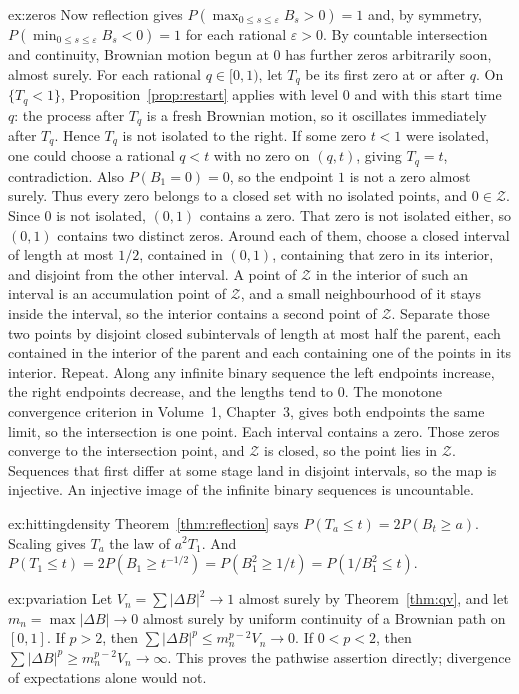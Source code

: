 \begin{solution}{ex:zeros}
Now reflection gives $P(\max_{0\le s\le\varepsilon}B_s>0)=1$ and, by symmetry, $P(\min_{0\le s\le\varepsilon}B_s<0)=1$ for each rational $\varepsilon>0$. By countable intersection and continuity, Brownian motion begun at $0$ has further zeros arbitrarily soon, almost surely. For each rational $q\in[0,1)$, let $T_q$ be its first zero at or after $q$. On $\{T_q<1\}$, Proposition~\ref{prop:restart} applies with level $0$ and with this start time $q$: the process after $T_q$ is a fresh Brownian motion, so it oscillates immediately after $T_q$. Hence $T_q$ is not isolated to the right. If some zero $t<1$ were isolated, one could choose a rational $q<t$ with no zero on $(q,t)$, giving $T_q=t$, contradiction. Also $P(B_1=0)=0$, so the endpoint $1$ is not a zero almost surely. Thus every zero belongs to a closed set with no isolated points, and $0\in\mathcal Z$. Since $0$ is not isolated, $(0,1)$ contains a zero. That zero is not isolated either, so $(0,1)$ contains two distinct zeros. Around each of them, choose a closed interval of length at most $1/2$, contained in $(0,1)$, containing that zero in its interior, and disjoint from the other interval. A point of $\mathcal Z$ in the interior of such an interval is an accumulation point of $\mathcal Z$, and a small neighbourhood of it stays inside the interval, so the interior contains a second point of $\mathcal Z$. Separate those two points by disjoint closed subintervals of length at most half the parent, each contained in the interior of the parent and each containing one of the points in its interior. Repeat. Along any infinite binary sequence the left endpoints increase, the right endpoints decrease, and the lengths tend to $0$. The monotone convergence criterion in Volume~1, Chapter~3, gives both endpoints the same limit, so the intersection is one point. Each interval contains a zero. Those zeros converge to the intersection point, and $\mathcal Z$ is closed, so the point lies in $\mathcal Z$. Sequences that first differ at some stage land in disjoint intervals, so the map is injective. An injective image of the infinite binary sequences is uncountable.
\end{solution}

\begin{solution}{ex:hittingdensity}
\writeup Theorem~\ref{thm:reflection} says $P(T_a\le t)=2P(B_t\ge a)$. Scaling gives $T_a$ the law of $a^2 T_1$. And $P(T_1\le t)=2P(B_1\ge t^{-1/2})=P(B_1^2\ge 1/t)=P(1/B_1^2\le t)$.
\end{solution}

\begin{solution}{ex:pvariation}
\writeup Let $V_n=\sum |\Delta B|^2\to1$ almost surely by Theorem~\ref{thm:qv}, and let $m_n=\max|\Delta B|\to0$ almost surely by uniform continuity of a Brownian path on $[0,1]$. If $p>2$, then $\sum|\Delta B|^p\le m_n^{p-2}V_n\to0$. If $0<p<2$, then $\sum|\Delta B|^p\ge m_n^{p-2}V_n\to\infty$. This proves the pathwise assertion directly; divergence of expectations alone would not.
\end{solution}

